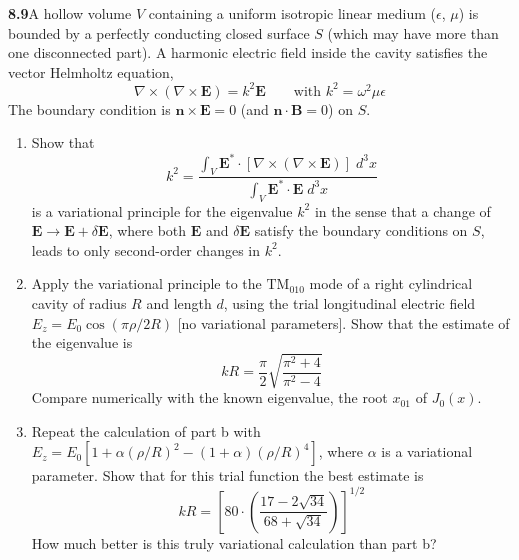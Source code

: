 \par\bigskip
\noindent\textbf{8.9}\quad A hollow volume $V$ containing a uniform isotropic linear medium ($\epsilon$, $\mu$) is bounded by a perfectly conducting closed surface $S$ (which may have more than one disconnected part). A harmonic electric field inside the cavity satisfies the vector Helmholtz equation,
\[
\nabla\times(\nabla\times\mathbf{E})=k^{2}\mathbf{E}\qquad\text{with }k^{2}=\omega^{2}\mu\epsilon
\]
The boundary condition is $\mathbf{n}\times\mathbf{E}=0$ (and $\mathbf{n}\cdot\mathbf{B}=0$) on $S$.
\begin{enumerate}
\item[(a)] Show that
\[
k^{2}=\frac{\displaystyle\int_{V}\mathbf{E}^{*}\cdot[\nabla\times(\nabla\times\mathbf{E})]\;d^{3}x}{\displaystyle\int_{V}\mathbf{E}^{*}\cdot\mathbf{E}\;d^{3}x}
\]
is a variational principle for the eigenvalue $k^{2}$ in the sense that a change of $\mathbf{E}\to\mathbf{E}+\delta\mathbf{E}$, where both $\mathbf{E}$ and $\delta\mathbf{E}$ satisfy the boundary conditions on $S$, leads to only second-order changes in $k^{2}$.
\item[(b)] Apply the variational principle to the $\mathrm{TM}_{010}$ mode of a right cylindrical cavity of radius $R$ and length $d$, using the trial longitudinal electric field $E_{z}=E_{0}\cos(\pi\rho/2R)$ [no variational parameters]. Show that the estimate of the eigenvalue is
\[
kR=\frac{\pi}{2}\sqrt{\frac{\pi^{2}+4}{\pi^{2}-4}}
\]
Compare numerically with the known eigenvalue, the root $x_{01}$ of $J_{0}(x)$.
\item[(c)] Repeat the calculation of part b with $E_{z}=E_{0}[1+\alpha(\rho/R)^{2}-(1+\alpha)(\rho/R)^{4}]$, where $\alpha$ is a variational parameter. Show that for this trial function the best estimate is
\[
kR=\left[80\cdot\left(\frac{17-2\sqrt{34}}{68+\sqrt{34}}\right)\right]^{1/2}
\]
How much better is this truly variational calculation than part b?
\end{enumerate}
\solution

